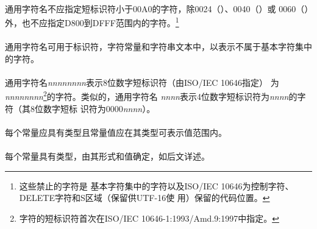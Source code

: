 \constraint
\paragraph{}
通用字符名不应指定短标识符小于00A0的字符，除0024（\tm{\$}）、0040（）或
0060（\tm{\sq}）外，也不应指定D800到DFFF范围内的字符。\footnote{这些禁止的字符是
基本字符集中的字符以及ISO/IEC 10646为控制字符、DELETE字符和S区域（保留供UTF-16使
用）保留的代码位置。}

\desc
\paragraph{}
通用字符名可用于标识符，字符常量和字符串文本中，以表示不属于基本字符集中的字符。

\semantic
\paragraph{}
通用字符名\textit{nnnnnnnn}表示8位数字短标识符（由ISO/IEC 10646指定）
为\linebreak\textit{nnnnnnnn}\footnote{字符的短标识符首次在ISO/IEC
10646-1:1993/Amd.9:1997中指定。}的字符。类似的，通用字符名
\textit{nnnn}表示4位数字短标识符为\textit{nnnn}的字符（其8位数字短标
识符为0000\textit{nnnn}）。

\syntax
\paragraph{}

\constraint
\paragraph{}
每个常量应具有类型且常量值应在其类型可表示值范围内。

\semantic
\paragraph{}
每个常量具有类型，由其形式和值确定，如后文详述。

\syntax
